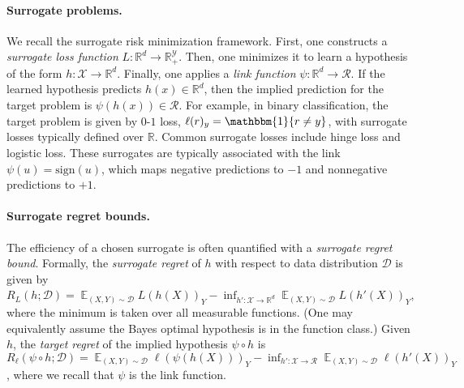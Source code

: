 \documentclass{article}
\theoremstyle{definition}\newtheorem{definition}{Definition}
\theoremstyle{definition}\newtheorem{assumption}{Assumption}
\newcommand{\reals}{\mathbb{R}}
\newcommand{\D}{\mathcal{D}}
\DeclareMathOperator{\E}{\mathbb{E}}  %
\newcommand{\R}{\mathcal{R}}
\newcommand{\X}{\mathcal{X}}
\newcommand{\Y}{\mathcal{Y}}
\newcommand{\ones}{\mathbbm{1}}
\begin{document}
\paragraph{Surrogate problems.}
We recall the surrogate risk minimization framework.
First, one constructs a \emph{surrogate loss function} $L:\reals^d\to\reals^\Y_+$.
Then, one minimizes it to learn a hypothesis of the form $h: \X \to \reals^d$.
Finally, one applies a \emph{link function} $\psi: \reals^d \to \R$.
If the learned hypothesis predicts $h(x) \in \reals^d$, then the implied prediction for the target problem is $\psi(h(x)) \in \R$.
For example, in binary classification, the target problem is given by $0$-$1$ loss, $\ell(r)_y = \ones\{r\neq y\}$, with surrogate losses typically defined over $\reals$.
Common surrogate losses include hinge loss and logistic loss.
These surrogates are typically associated with the link $\psi(u) = \mathrm{sign}(u)$, which maps negative predictions to $-1$ and nonnegative predictions to $+1$.

\paragraph{Surrogate regret bounds.}
The efficiency of a chosen surrogate is often quantified with a \emph{surrogate regret bound}.
Formally, the \emph{surrogate regret} of $h$ with respect to data distribution $\D$ is given by $R_L(h;\D) = \E_{(X,Y)\sim\D} L(h(X))_Y - \inf_{h':\X\to\reals^d} \E_{(X,Y)\sim\D} L(h'(X))_Y$, where the minimum is taken over all measurable functions.
(One may equivalently assume the Bayes optimal hypothesis is in the function class.)
Given $h$, the \emph{target regret} of the implied hypothesis $\psi \circ h$ is $R_\ell(\psi\circ h;\D) = \E_{(X,Y)\sim\D} \ell(\psi(h(X)))_Y - \inf_{h':\X\to\R} \E_{(X,Y)\sim\D} \ell(h'(X))_Y$, where we recall that $\psi$ is the link function.

\end{document}

